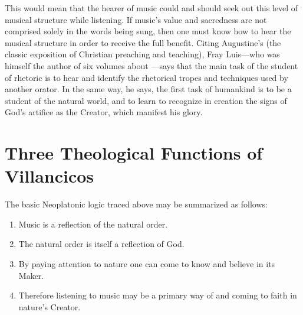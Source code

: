 This would mean that the hearer of music could and should seek out this level of musical structure while listening.
If music's value and sacredness are not comprised solely in the words being sung, then one must know how to hear the musical structure in order to receive the full benefit.
Citing Augustine's  (the classic exposition of Christian preaching and teaching), Fray Luis---who was himself the author of six volumes about ---says that the main task of the student of rhetoric is to hear and identify the rhetorical tropes and techniques used by another orator.
In the same way, he says, the first task of humankind is to be a student of the natural world, and to learn to recognize in creation the signs of God's artifice as the Creator, which manifest his glory.

\section{%
Three Theological Functions of Villancicos
}

The basic Neoplatonic logic traced above may be summarized as follows: 

\begin{enumerate}
\item Music is a reflection of the natural order.
\item The natural order is itself a reflection of God.
\item By paying attention to nature one can come to know and believe in its Maker.
\item Therefore listening to music may be a primary way of  and coming to faith in nature's Creator.
\end{enumerate}

